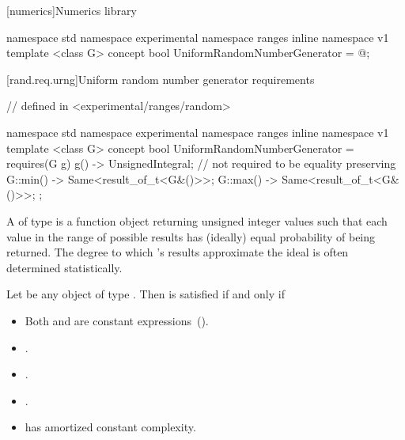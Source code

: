[numerics]{Numerics library}


\begin{codeblock}
namespace std { namespace experimental { namespace ranges { inline namespace v1 {
  template <class G>
  concept bool UniformRandomNumberGenerator = @\seebelow@;
}}}}
\end{codeblock}


[rand.req.urng]{Uniform random number generator requirements}%
%

\begin{codeblock}
// defined in <experimental/ranges/random>

namespace std { namespace experimental { namespace ranges { inline namespace v1 {
  template <class G>
  concept bool UniformRandomNumberGenerator =
    requires(G g) {
      { g() } -> UnsignedIntegral; // not required to be equality preserving
      { G::min() } -> Same<result_of_t<G&()>>;
      { G::max() } -> Same<result_of_t<G&()>>;
    };
}}}}
\end{codeblock}

\pnum
A 
 of type 
is a function object
returning unsigned integer values
such that each value
in the range of possible results
has (ideally) equal probability
of being returned.
\enternote
 The degree to which 's results
 approximate the ideal
 is often determined statistically.
\exitnote

\pnum
Let  be any object of type . Then
 is satisfied if and only if

\begin{itemize}
\item Both  and  are constant expressions~().
\item {}.
\item {}.
\item {}.
\item {} has amortized constant complexity.
\end{itemize}
